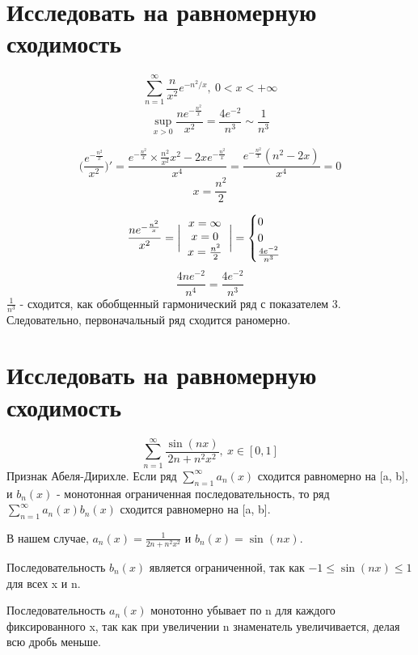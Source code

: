 \documentclass{article}
\begin{document}
\section{Исследовать на равномерную сходимость}
\[
    \sum\limits_{n=1}^\infty \frac{n}{x^2}e^{-n^2/x} , \ 0 < x < +\infty
\]
\[
    \sup\limits_{x>0} \frac{ne^{-\frac{n^2}{x}}}{x^2} = \frac{4e^{-2}}{n^3} \sim \frac{1}{n^3}
\]



\[
    \biggl( \frac{e^{-\frac{n^2}{x}}}{x^2}\biggr)' = \frac{e^{-\frac{n^2}{x}}\times \frac{n^2}{x^2} x^2 - 2 x e^{-\frac{n^2}{x}}}{x^4} = \frac{e^{-\frac{n^2}{x}}(n^2 - 2x)}{x^4} = 0
\]
\[
    x = \frac{n^2}{2}
\]

\[
     \frac{ne^{-\frac{n^2}{x}}}{x^2} = \bigg| \begin{tabular}{ c }
        $x=\infty$  \\ 
        $x=0$  \\  
        $x= \frac{n^2}{2}$     
       \end{tabular} \bigg| = \begin{cases}
        0 \\
        0 \\
          \frac{4e^{-2}}{n^3}
       \end{cases}
\]
\[
      \frac{4ne^{-2}}{n^4} = \frac{4e^{-2}}{n^3}
\]
$\frac{1}{n^{3}}$ - сходится, как обобщенный гармонический ряд с показателем 3. Следовательно, первоначальный ряд сходится раномерно.




\section{Исследовать на равномерную сходимость}
\[
	\sum\limits_{n=1}^\infty\frac{\sin(nx)}{2n+n^2x^2}, \ x\in [0, 1]
\]
Признак Абеля-Дирихле. Если ряд \(\sum_{n=1}^{\infty} a_n(x)\) сходится равномерно на [a, b], и ${b_n(x)}$ - монотонная ограниченная последовательность, то ряд \(\sum_{n=1}^{\infty} a_n(x)b_n(x)\) сходится равномерно на [a, b].

В нашем случае, \(a_n(x) = \frac{1}{2n+n^2x^2}\) и \(b_n(x) = \sin(nx)\).

Последовательность \(b_n(x)\) является ограниченной, так как \(-1 \leq \sin(nx) \leq 1\) для всех x и n.

Последовательность \(a_n(x)\) монотонно убывает по n для каждого фиксированного x, так как при увеличении n знаменатель увеличивается, делая всю дробь меньше.
\end{document}
